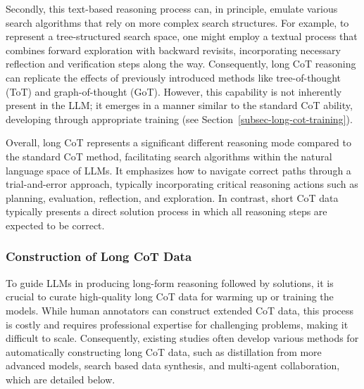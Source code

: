 Secondly, this text-based reasoning process can, in principle, emulate various search algorithms that rely on  more complex search structures. For example, to represent a tree-structured search space, one might employ a textual process that combines forward exploration with backward revisits, incorporating necessary reflection and verification steps along the way. Consequently, long CoT reasoning can replicate the effects of previously introduced methods like tree-of-thought (ToT) and graph-of-thought (GoT). However, this capability is not inherently present in the LLM; it emerges in a manner similar to the standard CoT ability, developing through appropriate training (see Section~\ref{subsec-long-cot-training}). 

Overall, long CoT represents a significant different reasoning mode compared to the standard CoT method, facilitating search algorithms within the natural language space of LLMs. It emphasizes how to navigate correct paths through a trial-and-error approach, typically incorporating critical reasoning actions such as planning, evaluation, reflection, and exploration. In contrast, short CoT data typically presents a direct solution process in which all reasoning steps are expected to be correct. 

\subsubsection{Construction of Long CoT Data}\label{subsec-long-cot-data}

To guide LLMs in producing long-form reasoning followed by solutions, it is crucial to curate high-quality long CoT data for warming up or training the models. While human annotators can construct extended CoT data, this process is costly and requires professional expertise for challenging problems, making it difficult to scale. Consequently, existing studies often develop various methods for automatically constructing long CoT data, such as distillation from more advanced models, search based data synthesis, and multi-agent collaboration, which are detailed below.

